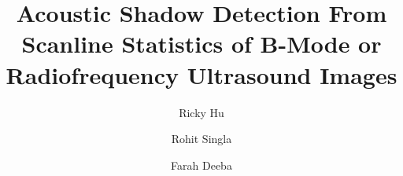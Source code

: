 \documentclass[preprint,5p,authoryear]{elsarticle}
\begin{document}
\begin{frontmatter}



\title{Acoustic Shadow Detection From Scanline Statistics of B-Mode or Radiofrequency Ultrasound Images}






\author[Affil1]{Ricky Hu}
\author[Affil2]{Rohit Singla}
\author[Affil1]{Farah Deeba }

\address[Affil1]{Robotics and Control Laboratory, Department of Electrical and Computer Engineering, University of British Columbia, Vancouver, Canada}



\end{frontmatter}
\end{document}
